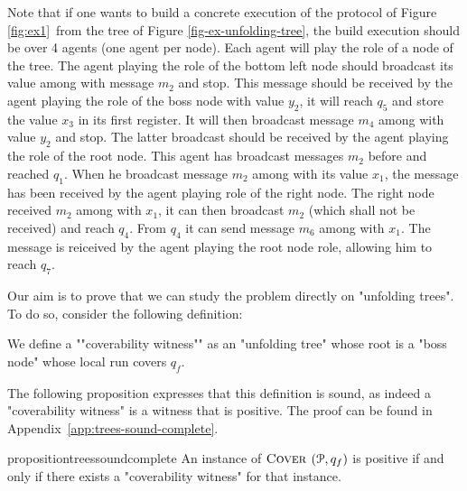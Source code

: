 \begin{example}
	
	
	
	Note that if one wants to build a concrete execution of the protocol of Figure \ref{fig:ex1}~from the tree of Figure \ref{fig-ex-unfolding-tree}, the build execution should be over 4 agents (one agent per node). Each agent will play the role of a node of the tree. The agent playing the role of the bottom left node should broadcast its value among with message $m_2$ and stop. This message should be received by the agent playing the role of the boss node with value $y_2$, it will reach $q_5$ and store the value $x_3$ in its first register. It will then broadcast message $m_4$ among with value $y_2$ and stop. The latter broadcast should be received by the agent playing the role of the root node. This agent has broadcast messages $m_2$ before and reached $q_1$. When he broadcast message $m_2$ among with its value $x_1$, the message has been received by the agent playing role of the right node.
	The right node received $m_2$ among with $x_1$, it can then broadcast $m_2$ (which shall not be received) and reach $q_4$. From $q_4$ it can send message $m_6$ among with $x_1$. The message is reiceived by the agent playing the root node role, allowing him to reach $q_7$.
	
	
	

\end{example}


Our aim is to prove that we can study the \COVER problem directly on "unfolding trees". To do so, consider the following definition: 

\begin{definition}
\label{def:cov_witness}
We define a ""coverability witness"" as an "unfolding tree" whose root is a "boss node" whose local run covers $q_f$. 
\end{definition}

The following proposition expresses that this definition is sound, as indeed a "coverability witness" is a witness that \COVER is positive.
The proof can be found in Appendix~\ref{app:trees-sound-complete}.


\begin{restatable}{proposition}{treessoundcomplete}
\label{prop:trees-sound-complete}
An instance of $\textsc{Cover}$ $(\mathcal{P},q_f)$ is positive if and only if there exists a "coverability witness" for that instance.
\end{restatable}

